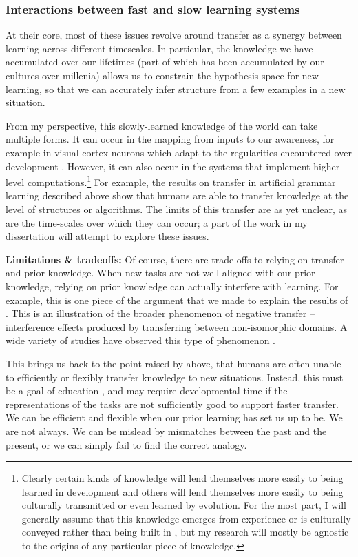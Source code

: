 \documentclass[11pt]{article}
\begin{document}
\subsubsection{Interactions between fast and slow learning systems}
At their core, most of these issues revolve around transfer as a synergy between learning across different timescales. In particular, the knowledge we have accumulated over our lifetimes (part of which has been accumulated by our cultures over millenia) allows us to constrain the hypothesis space for new learning, so that we can accurately infer structure from a few examples in a new situation. \par 
From my perspective, this slowly-learned knowledge of the world can take multiple forms. It can occur in the mapping from inputs to our awareness, for example in visual cortex neurons which adapt to the regularities encountered over development \citep{Barlow1975}. However, it can also occur in the systems that implement higher-level computations.\footnote{Clearly certain kinds of knowledge will lend themselves more easily to being learned in development and others will lend themselves more easily to being culturally transmitted or even learned by evolution. For the most part, I will generally assume that this knowledge emerges from experience or is culturally conveyed rather than being built in \citep{Hansen2017}, but my research will mostly be agnostic to the origins of any particular piece of knowledge.} For example, the results on transfer in artificial grammar learning described above \citep[e.g.]{Tunney2001} show that humans are able to transfer knowledge at the level of structures or algorithms. The limits of this transfer are as yet unclear, as are the time-scales over which they can occur; a part of the work in my dissertation will attempt to explore these issues.\par  
\textbf{Limitations \& tradeoffs:} Of course, there are trade-offs to relying on transfer and prior knowledge. When new tasks are not well aligned with our prior knowledge, relying on prior knowledge can actually interfere with learning. For example, this is one piece of the argument that we made \citep{Lampinen2017b} to explain the results of \citet{Kaminski2008}. This is an illustration of the broader phenomenon of negative transfer -- interference effects produced by transferring between non-isomorphic domains. A wide variety of studies have observed this type of phenomenon \citep[e.g.]{Luchins1942, Landrum2005}. \par
This brings us back to the point raised by \citet{Detterman1993} above, that humans are often unable to efficiently or flexibly transfer knowledge to new situations. Instead, this must be a goal of education \citep{Bransford1999}, and may require developmental time \citep{Lampinen2017a} if the representations of the tasks are not sufficiently good to support faster transfer. We can be efficient and flexible when our prior learning has set us up to be. We are not always. We can be mislead by mismatches between the past and the present, or we can simply fail to find the correct analogy.\par
\end{document}
